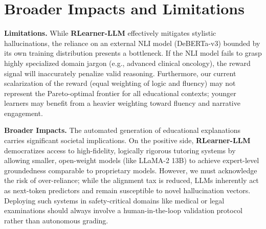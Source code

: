 \section*{Broader Impacts and Limitations}

\textbf{Limitations.} While \textbf{RLearner-LLM} effectively mitigates stylistic hallucinations, the reliance on an external NLI model (DeBERTa-v3) bounded by its own training distribution presents a bottleneck. If the NLI model fails to grasp highly specialized domain jargon (e.g., advanced clinical oncology), the reward signal will inaccurately penalize valid reasoning. Furthermore, our current scalarization of the reward (equal weighting of logic and fluency) may not represent the Pareto-optimal frontier for all educational contexts; younger learners may benefit from a heavier weighting toward fluency and narrative engagement.

\textbf{Broader Impacts.} The automated generation of educational explanations carries significant societal implications. On the positive side, \textbf{RLearner-LLM} democratizes access to high-fidelity, logically rigorous tutoring systems by allowing smaller, open-weight models (like LLaMA-2 13B) to achieve expert-level groundedness comparable to proprietary models. However, we must acknowledge the risk of over-reliance; while the alignment tax is reduced, LLMs inherently act as next-token predictors and remain susceptible to novel hallucination vectors. Deploying such systems in safety-critical domains like medical or legal examinations should always involve a human-in-the-loop validation protocol rather than autonomous grading.
